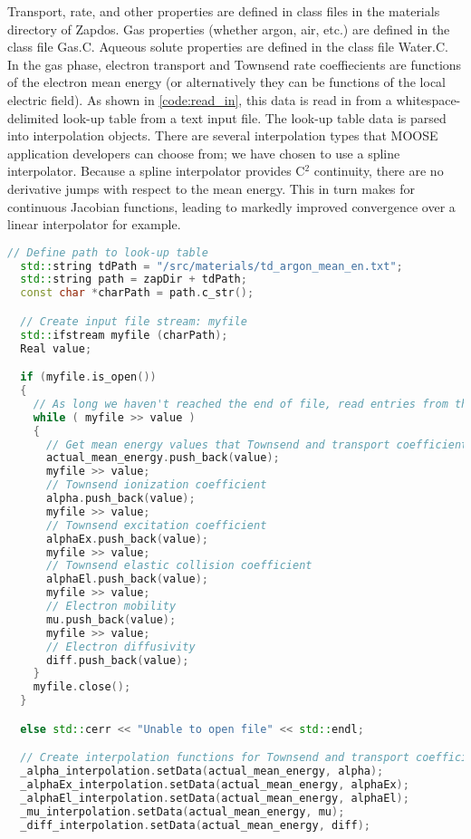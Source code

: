 Transport, rate, and other properties are defined in class files in the materials directory of Zapdos. Gas properties (whether argon, air, etc.) are defined in the class file Gas.C. Aqueous solute properties are defined in the class file Water.C. In the gas phase, electron transport and Townsend rate coeffiecients are functions of the electron mean energy (or alternatively they can be functions of the local electric field). As shown in \cref{code:read_in}, this data is read in from a whitespace-delimited look-up table from a text input file. The look-up table data is parsed into interpolation objects. There are several interpolation types that MOOSE application developers can choose from; we have chosen to use a spline interpolator. Because a spline interpolator provides C$^2$ continuity, there are no derivative jumps with respect to the mean energy. This in turn makes for continuous Jacobian functions, leading to markedly improved convergence over a linear interpolator for example.

\begin{lstlisting}[language=C++, caption = Code for reading in electron transport and Townsend coefficient data from a lookup table in a text file, label = code:read_in]
  // Define path to look-up table
  std::string tdPath = "/src/materials/td_argon_mean_en.txt";
  std::string path = zapDir + tdPath;
  const char *charPath = path.c_str();

  // Create input file stream: myfile
  std::ifstream myfile (charPath);
  Real value;

  if (myfile.is_open())
  {
    // As long we haven't reached the end of file, read entries from the look-up table into respective data arrays
    while ( myfile >> value )
    {
      // Get mean energy values that Townsend and transport coefficients are a function of
      actual_mean_energy.push_back(value);
      myfile >> value;
      // Townsend ionization coefficient
      alpha.push_back(value);
      myfile >> value;
      // Townsend excitation coefficient
      alphaEx.push_back(value);
      myfile >> value;
      // Townsend elastic collision coefficient
      alphaEl.push_back(value);
      myfile >> value;
      // Electron mobility
      mu.push_back(value);
      myfile >> value;
      // Electron diffusivity
      diff.push_back(value);
    }
    myfile.close();
  }

  else std::cerr << "Unable to open file" << std::endl;

  // Create interpolation functions for Townsend and transport coefficients that depend on the mean energy
  _alpha_interpolation.setData(actual_mean_energy, alpha);
  _alphaEx_interpolation.setData(actual_mean_energy, alphaEx);
  _alphaEl_interpolation.setData(actual_mean_energy, alphaEl);
  _mu_interpolation.setData(actual_mean_energy, mu);
  _diff_interpolation.setData(actual_mean_energy, diff);
\end{lstlisting}

